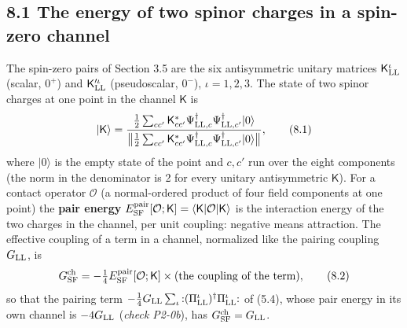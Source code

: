 \documentclass[
  10pt,
]{article}
\begin{document}
\hypertarget{the-energy-of-two-spinor-charges-in-a-spin-zero-channel}{%
\subsection{8.1 The energy of two spinor charges in a spin-zero
channel}\label{the-energy-of-two-spinor-charges-in-a-spin-zero-channel}}

The spin-zero pairs of Section 3.5 are the six antisymmetric unitary
matrices \(\mathsf K^\iota_{\rm LL}\) (scalar, \(0^+\)) and
\(\mathsf K'^\iota_{\rm LL}\) (pseudoscalar, \(0^-\)), \(\iota=1,2,3\).
The state of two spinor charges at one point in the channel
\(\mathsf K\) is
\[\lvert\mathsf K\rangle=\frac{\tfrac12\sum_{cc'}\mathsf K^*_{cc'}\Psi^\dagger_{{\rm LL},c}\Psi^\dagger_{{\rm LL},c'}\lvert0\rangle}{\big\lVert\tfrac12\sum_{cc'}\mathsf K^*_{cc'}\Psi^\dagger_{{\rm LL},c}\Psi^\dagger_{{\rm LL},c'}\lvert0\rangle\big\rVert},\tag{8.1}\]
where \(\lvert0\rangle\) is the empty state of the point and \(c,c'\)
run over the eight components (the norm in the denominator is 2 for
every unitary antisymmetric \(\mathsf K\)). For a contact operator
\(\mathcal O\) (a normal-ordered product of four field components at one
point) the \textbf{pair energy}
\(E^{\rm pair}_{\rm SF}[\mathcal O;\mathsf K]=\langle\mathsf K\rvert\mathcal O\lvert\mathsf K\rangle\)
is the interaction energy of the two charges in the channel, per unit
coupling: negative means attraction. The effective coupling of a term in
a channel, normalized like the pairing coupling \(G_{\rm LL}\), is
\[G^{\rm ch}_{\rm SF}=-\tfrac14E^{\rm pair}_{\rm SF}[\mathcal O;\mathsf K]\times(\text{the coupling of the term}),\tag{8.2}\]
so that the pairing term
\(-\tfrac14G_{\rm LL}\sum_\iota{:}(\Pi^\iota_{\rm LL})^\dagger\Pi^\iota_{\rm LL}{:}\)
of (5.4), whose pair energy in its own channel is \(-4G_{\rm LL}\)
(\emph{check P2-0b}), has \(G^{\rm ch}_{\rm SF}=G_{\rm LL}\).
\end{document}
